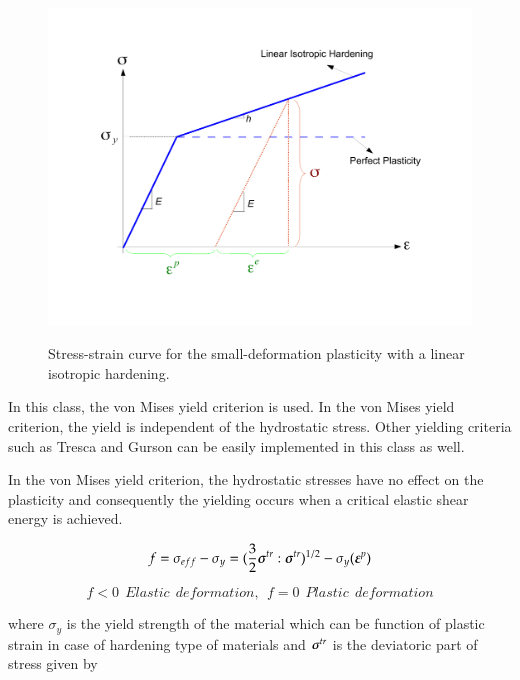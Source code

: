 \noindent 
\begin{figure}[htp]
  \centering
   {\includegraphics[scale=0.4, clip]{figures/isotropic_hardening_plasticity.pdf}}
   \caption{
    Stress-strain curve for the small-deformation plasticity with a linear isotropic hardening.
   }
  \label{fig:smm:cl:Lin-strain-hard}
\end{figure}

\noindent In this class, the von Mises yield criterion is used. In the von Mises yield criterion, the yield is independent of the hydrostatic stress. Other yielding criteria such as Tresca and Gurson can be easily implemented in this class as well.

In the von Mises yield criterion, the hydrostatic stresses have no effect on the plasticity and consequently the yielding occurs when a critical elastic shear energy is achieved.

\begin{equation} \label{eqn:smm:constitutive:von Mises}
	f = \sigma_{eff} - \sigma_y = (\frac{3}{2} {\boldsymbol{\sigma}}^{tr} : {\boldsymbol{\sigma}}^{tr})^{1/2}-\sigma_y (\boldsymbol{\varepsilon}^p)
\end{equation}

\begin{equation} \label{eqn:smm:constitutive:yielding}
 	f < 0 \   \  Elastic \  \ deformation, \                                   \
	f = 0 \   \  Plastic \  \ deformation
\end{equation}

where $\sigma_y$ is the yield strength of the material which can be function of plastic strain in case of hardening type of materials and ${\boldsymbol{\sigma}}^{tr}$ is the deviatoric part of stress given by

